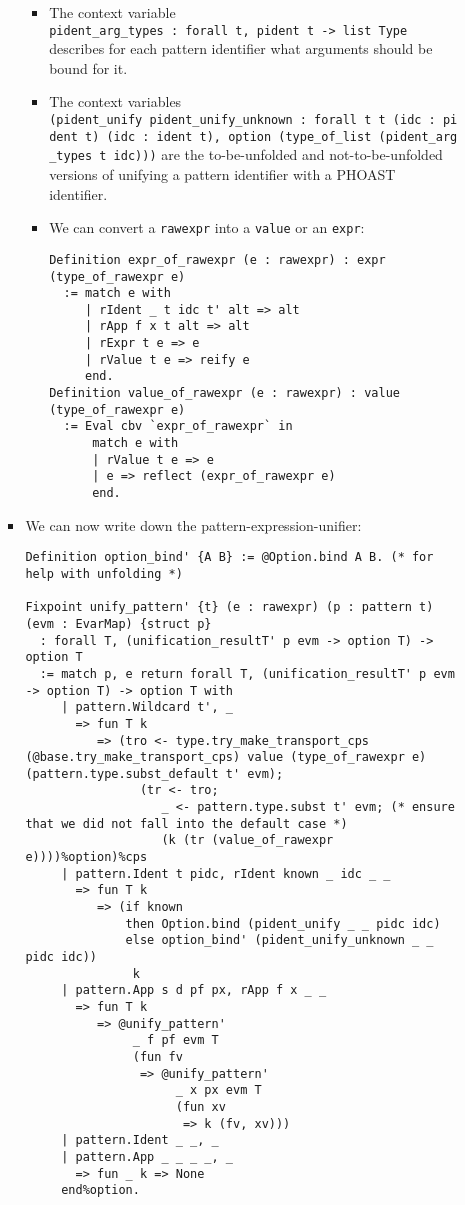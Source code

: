 \documentclass[
]{article}
\begin{document}
\begin{itemize}
\begin{itemize}
\begin{itemize}
      \begin{itemize}
      \item
        The context variable
        \texttt{pident\_arg\_types\ :\ forall\ t,\ pident\ t\ -\textgreater{}\ list\ Type}
        describes for each pattern identifier what arguments should be
        bound for it.
      \item
        The context variables
        \texttt{(pident\_unify\ pident\_unify\_unknown\ :\ forall\ t\ t\textquotesingle{}\ (idc\ :\ pident\ t)\ (idc\textquotesingle{}\ :\ ident\ t\textquotesingle{}),\ option\ (type\_of\_list\ (pident\_arg\_types\ t\ idc)))}
        are the to-be-unfolded and not-to-be-unfolded versions of
        unifying a pattern identifier with a PHOAST identifier.
      \item
        We can convert a \texttt{rawexpr} into a \texttt{value} or an
        \texttt{expr}:

\begin{verbatim}
Definition expr_of_rawexpr (e : rawexpr) : expr (type_of_rawexpr e)
  := match e with
     | rIdent _ t idc t' alt => alt
     | rApp f x t alt => alt
     | rExpr t e => e
     | rValue t e => reify e
     end.
Definition value_of_rawexpr (e : rawexpr) : value (type_of_rawexpr e)
  := Eval cbv `expr_of_rawexpr` in
      match e with
      | rValue t e => e
      | e => reflect (expr_of_rawexpr e)
      end.
\end{verbatim}
      \end{itemize}
    \item
      We can now write down the pattern-expression-unifier:

\begin{verbatim}
Definition option_bind' {A B} := @Option.bind A B. (* for help with unfolding *)

Fixpoint unify_pattern' {t} (e : rawexpr) (p : pattern t) (evm : EvarMap) {struct p}
  : forall T, (unification_resultT' p evm -> option T) -> option T
  := match p, e return forall T, (unification_resultT' p evm -> option T) -> option T with
     | pattern.Wildcard t', _
       => fun T k
          => (tro <- type.try_make_transport_cps (@base.try_make_transport_cps) value (type_of_rawexpr e) (pattern.type.subst_default t' evm);
                (tr <- tro;
                   _ <- pattern.type.subst t' evm; (* ensure that we did not fall into the default case *)
                   (k (tr (value_of_rawexpr e))))%option)%cps
     | pattern.Ident t pidc, rIdent known _ idc _ _
       => fun T k
          => (if known
              then Option.bind (pident_unify _ _ pidc idc)
              else option_bind' (pident_unify_unknown _ _ pidc idc))
               k
     | pattern.App s d pf px, rApp f x _ _
       => fun T k
          => @unify_pattern'
               _ f pf evm T
               (fun fv
                => @unify_pattern'
                     _ x px evm T
                     (fun xv
                      => k (fv, xv)))
     | pattern.Ident _ _, _
     | pattern.App _ _ _ _, _
       => fun _ k => None
     end%option.
\end{verbatim}


\end{itemize}
\end{itemize}
\end{itemize}
\end{document}
